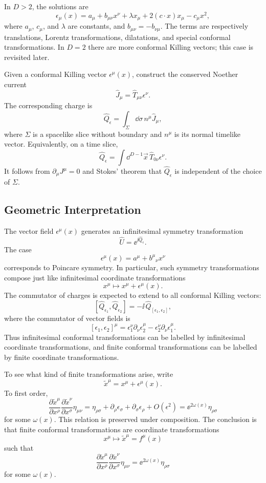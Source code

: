 In \(D>2\), the solutions are
\[
  \epsilon_\mu(x)
  =
  a_\mu+b_{\mu\nu}x^\nu+\lambda x_\mu
  +2(c\cdot x)x_\mu-c_\mu x^2,
\]
where \(a_\mu\), \(c_\mu\), and \(\lambda\) are constants, and
\(b_{\mu\nu}=-b_{\nu\mu}\).  The terms are respectively translations,
Lorentz transformations, dilatations, and special conformal
transformations.  In \(D=2\) there are more conformal Killing vectors;
this case is revisited later.

Given a conformal Killing vector \(\epsilon^\mu(x)\), construct the
conserved Noether current
\[
  \widehat J_\mu=\widehat T_{\mu\nu}\epsilon^\nu.
\]
The corresponding charge is
\[
  \widehat Q_\epsilon
  =
  \int_\Sigma \dd\sigma\,n^\mu\widehat J_\mu,
\]
where \(\Sigma\) is a spacelike slice without boundary and \(n^\mu\) is
its normal timelike vector.  Equivalently, on a time slice,
\[
  \widehat Q_\epsilon
  =
  \int \dd^{D-1}\vec x\,\widehat T_{0\nu}\epsilon^\nu .
\]
It follows from \(\partial_\mu J^\mu=0\) and Stokes' theorem that
\(\widehat Q_\epsilon\) is independent of the choice of \(\Sigma\).

\subsection{Geometric Interpretation}

The vector field \(\epsilon^\mu(x)\) generates an infinitesimal symmetry
transformation
\[
  \widehat U=\ee^{\ii\widehat Q_\epsilon}.
\]
The case
\[
  \epsilon^\mu(x)=a^\mu+b^\mu{}_\nu x^\nu
\]
corresponds to Poincare symmetry.  In particular, such symmetry
transformations compose just like infinitesimal coordinate
transformations
\[
  x^\mu\mapsto x^\mu+\epsilon^\mu(x).
\]
The commutator of charges is expected to extend to all conformal Killing
vectors:
\[
  [\widehat Q_{\epsilon_1},\widehat Q_{\epsilon_2}]
  =
  -\ii\,\widehat Q_{[\epsilon_1,\epsilon_2]},
\]
where the commutator of vector fields is
\[
  [\epsilon_1,\epsilon_2]^\mu
  =
  \epsilon_1^\nu\partial_\nu\epsilon_2^\mu
  -
  \epsilon_2^\nu\partial_\nu\epsilon_1^\mu .
\]
Thus infinitesimal conformal transformations can be labelled by
infinitesimal coordinate transformations, and finite conformal
transformations can be labelled by finite coordinate transformations.

To see what kind of finite transformations arise, write
\[
  \tilde x^\mu=x^\mu+\epsilon^\mu(x).
\]
To first order,
\[
  \frac{\partial\tilde x^\mu}{\partial x^\rho}
  \frac{\partial\tilde x^\nu}{\partial x^\sigma}\eta_{\mu\nu}
  =
  \eta_{\rho\sigma}
  +\partial_\rho\epsilon_\sigma+\partial_\sigma\epsilon_\rho
  +O(\epsilon^2)
  =
  \ee^{2\omega(x)}\eta_{\rho\sigma}
\]
for some \(\omega(x)\).  This relation is preserved under composition.
The conclusion is that finite conformal transformations are coordinate
transformations
\[
  x^\mu\mapsto \tilde x^\mu=f^\mu(x)
\]
such that
\[
  \frac{\partial\tilde x^\mu}{\partial x^\rho}
  \frac{\partial\tilde x^\nu}{\partial x^\sigma}\eta_{\mu\nu}
  =
  \ee^{2\omega(x)}\eta_{\rho\sigma}
\]
for some \(\omega(x)\).

